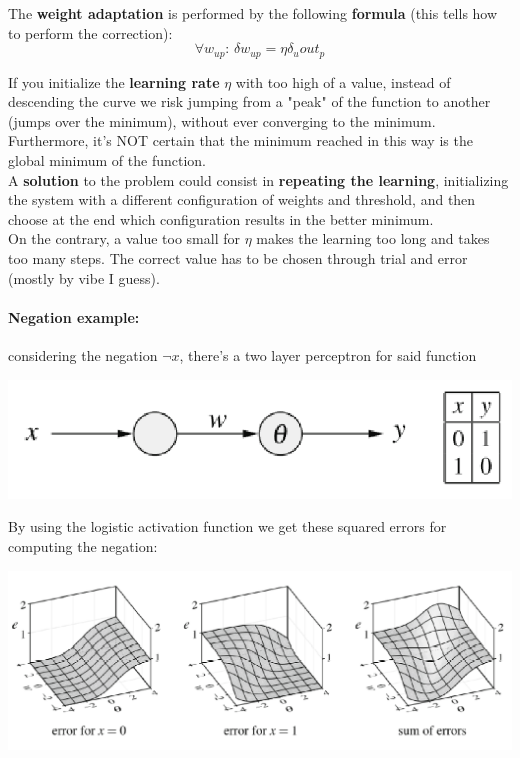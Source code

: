 The \textbf{weight adaptation} is performed by the following \textbf{formula} (this tells how to perform the correction):
$$ \forall w_{up} : \, \delta w_{up} = \eta \delta_u out_p $$

If you initialize the \textbf{learning rate} $\eta$ with too high of a value, instead of descending the curve we risk jumping from a "peak" of the function to another (jumps over the minimum), without ever converging to the minimum. Furthermore, it's NOT certain that the minimum reached in this way is the global minimum of the function. \\

A \textbf{solution} to the problem could consist in \textbf{repeating the learning}, initializing the system with a different configuration of weights and threshold, and then choose at the end which configuration results in the better minimum.\\

On the contrary, a value too small for $\eta$ makes the learning too long and takes too many steps. The correct value has to be chosen through trial and error (mostly by vibe I guess).\\


\paragraph{Negation example:} considering the negation $\neg x$, there's a two layer perceptron for said function
\begin{center}
	\includegraphics[width=0.5\columnwidth]{img/NN/neg1}
\end{center}
By using the logistic activation function we get these squared errors for computing the negation:
\begin{center}
	\includegraphics[width=0.9\columnwidth]{img/NN/neg2}
\end{center}

